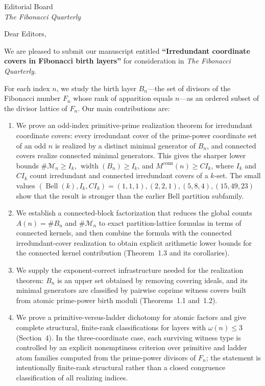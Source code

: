\documentclass[11pt]{letter}
\date{\today}
\begin{document}
\begin{letter}{%
Editorial Board\\
\emph{The Fibonacci Quarterly}}

\opening{Dear Editors,}

We are pleased to submit our manuscript entitled \textbf{``Irredundant
coordinate covers in Fibonacci birth layers''} for
consideration in \emph{The Fibonacci Quarterly}.

For each index $n$, we study the birth layer $B_n$---the set of divisors of
the Fibonacci number $F_n$ whose rank of apparition equals $n$---as an
ordered subset of the divisor lattice of $F_n$. Our main contributions are:

\begin{enumerate}
\item We prove an odd-index primitive-prime realization theorem for
irredundant coordinate covers: every irredundant cover of the prime-power
coordinate set of an odd $n$ is realized by a distinct minimal generator of
$B_n$, and connected covers realize connected minimal generators. This gives
the sharper lower bounds $\#\mathcal M_n\ge I_k$, $\operatorname{width}(B_n)\ge
I_k$, and $M^{\mathrm{conn}}(n)\ge CI_k$, where $I_k$ and $CI_k$ count
irredundant and connected irredundant covers of a $k$-set. The small values
$(\operatorname{Bell}(k),I_k,CI_k)=(1,1,1),(2,2,1),(5,8,4),(15,49,23)$ show
that the result is stronger than the earlier Bell partition subfamily.

\item We establish a connected-block factorization that reduces the global
counts $A(n)=\#B_n$ and $\#\mathcal{M}_n$ to exact partition-lattice formulas
in terms of connected kernels, and then combine the formula with the connected
irredundant-cover realization to obtain explicit arithmetic lower bounds for
the connected kernel contribution (Theorem~1.3 and its corollaries).

\item We supply the exponent-correct infrastructure needed for the realization
theorem: $B_n$ is an upper set obtained by removing covering ideals, and its
minimal generators are classified by pairwise coprime witness covers built from
atomic prime-power birth moduli (Theorems~1.1 and~1.2).

\item We prove a primitive-versus-ladder dichotomy for atomic factors and give
complete structural, finite-rank classifications for layers with
$\omega(n)\le 3$ (Section~4). In the three-coordinate case, each surviving
witness type is controlled by an explicit nonemptiness criterion over
primitive and ladder atom families computed from the prime-power divisors of
$F_n$; the statement is intentionally finite-rank structural rather than a
closed congruence classification of all realizing indices.
\end{enumerate}


\end{letter}
\end{document}
